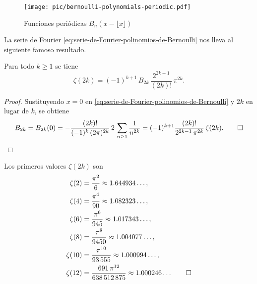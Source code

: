 \begin{figure}
  \begin{center}
    \texttt{[image: pic/bernoulli-polynomials-periodic.pdf]}
  \end{center}

  \caption{Funciones periódicas $B_n (x - \lfloor x\rfloor)$}
\end{figure}

La serie de Fourier \eqref{eq:serie-de-Fourier-polinomios-de-Bernoulli} nos
lleva al siguiente famoso resultado.

\begin{teorema}[Euler]
  Para todo $k\ge 1$ se tiene
  $$\zeta (2k) = (-1)^{k+1} \, B_{2k}\,\frac{2^{2k-1}}{(2k)!}\,\pi^{2k}.$$

  \begin{proof}
    Sustituyendo $x = 0$ en \eqref{eq:serie-de-Fourier-polinomios-de-Bernoulli}
    y $2k$ en lugar de $k$, se obtiene
    \[ B_{2k} = B_{2k} (0) =
       -\frac{(2k)!}{(-1)^k\,(2\pi)^{2k}} \, 2\,\sum_{n \ge 1} \frac{1}{n^{2k}} =
       (-1)^{k+1}\frac{(2k)!}{2^{2k-1}\,\pi^{2k}}\,\zeta (2k). \qedhere \]
    \end{proof}
\end{teorema}

\begin{ejemplo}
  Los primeros valores $\zeta (2k)$ son
  \begin{align*}
    \zeta (2) & = \frac{\pi^2}{6} \approx 1.644934\ldots, \\
    \zeta (4) & = \frac{\pi^4}{90} \approx 1.082323\ldots, \\
    \zeta (6) & = \frac{\pi^6}{945}  \approx 1.017343\ldots, \\
    \zeta (8) & = \frac{\pi^8}{9450} \approx 1.004077\ldots, \\
    \zeta (10) & = \frac{\pi^{10}}{93\,555} \approx 1.000994\ldots, \\
    \zeta (12) & = \frac{691\,\pi^{12}}{638\,512\,875} \approx 1.000246\ldots \qedhere
  \end{align*}
\end{ejemplo}

